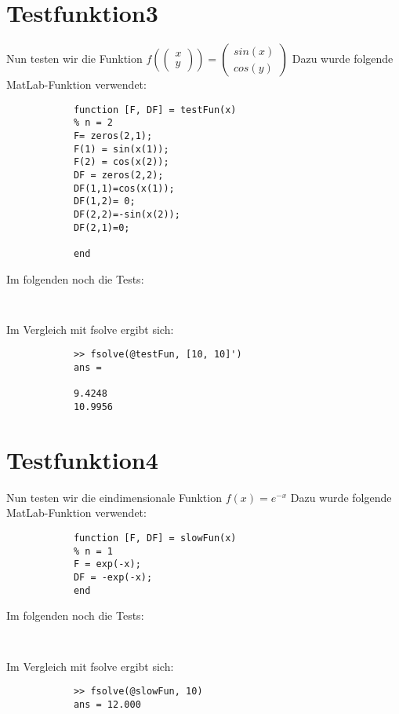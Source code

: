 \documentclass[11pt,titlepage]{article}
\begin{document}
	\section{Testfunktion3}
		Nun testen wir die Funktion $ f(\begin{pmatrix} x \\ y \end{pmatrix}) = \begin{pmatrix} sin(x) \\ cos(y) \end{pmatrix}$
		Dazu wurde folgende MatLab-Funktion verwendet:
		\begin{lstlisting}
			function [F, DF] = testFun(x)
			% n = 2    
			F= zeros(2,1);
			F(1) = sin(x(1));
			F(2) = cos(x(2));
			DF = zeros(2,2);
			DF(1,1)=cos(x(1));
			DF(1,2)= 0;
			DF(2,2)=-sin(x(2));
			DF(2,1)=0;    
			
			end
		\end{lstlisting}
		
		Im folgenden noch die Tests:
		
		\begin{lstlisting}
			
		\end{lstlisting}
		
		Im Vergleich mit fsolve ergibt sich:
		
		\begin{lstlisting}
			>> fsolve(@testFun, [10, 10]')
			ans =
			
			9.4248  
			10.9956
		\end{lstlisting}
	
	\section{Testfunktion4}
		Nun testen wir die eindimensionale Funktion $ f(x) = e^{-x}$
		Dazu wurde folgende MatLab-Funktion verwendet:
		\begin{lstlisting}
			function [F, DF] = slowFun(x)
			% n = 1  
			F = exp(-x);
			DF = -exp(-x);
			end
		\end{lstlisting}
	
		Im folgenden noch die Tests:
		
		\begin{lstlisting}
			
		\end{lstlisting}
		
		Im Vergleich mit fsolve ergibt sich:
		
		\begin{lstlisting}
			>> fsolve(@slowFun, 10)
			ans = 12.000
		\end{lstlisting}
	
\end{document}
